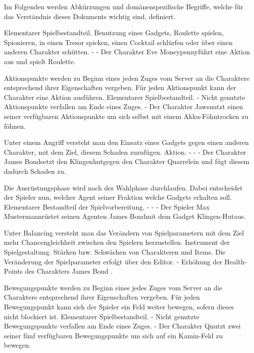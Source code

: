 Im Folgenden werden Abkürzungen und domänenspezifische Begriffe, welche für das Verständnis dieses Dokuments wichtig sind, definiert.


{}
{Elementarer Spielbestandteil.}
{Benutzung eines Gadgets, Roulette spielen, Spionieren, in einen Tresor spicken, einen Cocktail schlürfen oder über einen anderen Charakter schütten.}
{-}
{-}
{Der Charakter \glqq Eve Moneypenny\grqq führt eine Aktion aus und spielt Roulette.}

{Aktionspunkte werden zu Beginn eines jeden Zuges vom Server an die Charaktere entsprechend ihrer Eigenschaften vergeben. Für jeden Aktionspunkt kann der Charakter eine Aktion ausführen.}
{Elementarer Spielbestandteil.}
{-}
{Nicht genutzte Aktionspunkte verfallen am Ende eines Zuges.}
{-}
{Der Charakter \glqq Jaws\grqq nutzt einen seiner verfügbaren Aktionspunkte um sich selbst mit einem \glqq Akku-Föhn\grqq trocken zu föhnen.}

{Unter einem Angriff versteht man den Einsatz eines Gadgets gegen einen anderen Charakter, mit dem Ziel, diesem Schaden zuzufügen.}
{Aktion.}
{-}
{-}
{-}
{Der Charakter \glqq James Bond\grqq setzt den \glqq Klingenhut\grqq gegen den Charakter \glqq Quarrel\grqq ein und fügt diesem dadurch Schaden zu.}

{Die Ausrüstungsphase wird nach der Wahlphase durchlaufen. Dabei entscheidet der Spieler nun, welcher Agent seiner Fraktion welche Gadgets erhalten soll. }
{Elementarer Bestandteil der Spielvorbereitung.}
{-}
{-}
{-}
{Der Spieler \glqq Max Mustermann\grqq rüstet seinen Agenten \glqq James Bond\grqq mit dem Gadget \glqq Klingen-Hut\grqq aus.}

{Unter Balancing versteht man das Verändern von Spielparametern mit dem Ziel mehr Chancengleichheit zwischen den Spielern herzustellen.}
{Instrument der Spielgestaltung.}
{Stärken bzw. Schwächen von Charakteren und Items.}
{Die Veränderung der Spielparameter erfolgt über den Editor.}
{-}
{Erhöhung der Health-Points des Charakters \glqq James Bond \grqq.}

{Bewegungspunkte werden zu Beginn eines jedes Zuges vom Server an die Charaktere entsprechend ihrer Eigenschaften vergeben. Für jeden Bewegungspunkt kann sich der Spieler ein Feld weiter bewegen, sofern dieses nicht blockiert ist.}
{Elementarer Spielbestandteil.}
{-}
{Nicht genutzte Bewegungspunkte verfallen am Ende eines Zuges.}
{-}
{Der Charakter \glqq Q\grqq nutzt zwei seiner fünf verfügbaren Bewegungspunkte um sich auf ein Kamin-Feld zu bewegen.}

